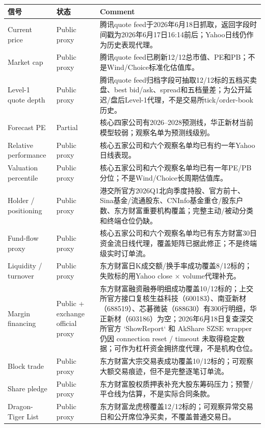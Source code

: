 \begin{exhibitbox}
\small
\begin{tabularx}{\textwidth}{L{3cm}L{2.5cm}X}
\toprule
\textbf{信号} & \textbf{状态} & \textbf{Comment} \\
\midrule
Current price & Public proxy & 腾讯quote feed于2026年6月18日抓取，返回字段时间戳为2026年6月17日16:14前后；Yahoo日线仍作为历史表现代理。 \\
Market cap & Public proxy & 腾讯quote feed已刷新12/12总市值、PE和PB；不是Wind/Choice标准化估值库。 \\
Level-1 quote depth & Public proxy & 腾讯quote feed归档字段可抽取12/12标的五档买卖盘、best bid/ask、spread和五档量差；为公开延迟/盘后Level-1代理，不是交易所tick/order-book历史。 \\
Forecast PE & Partial & 核心四家公司有2026--2028预测线，华正新材当前模型较弱；观察名单为预测线级别。 \\
Relative performance & Public proxy & 核心五家公司和六个观察名单均已有约一年Yahoo日线表现。 \\
Valuation percentile & Public proxy & 核心五家公司和六个观察名单均已有一年PE/PB分位；不是Wind/Choice长周期估值库。 \\
Holder / positioning & Public proxy & 港交所官方2026Q1北向季度持股、官方前十、Sina基金/流通股东、CNInfo基金重仓/股东户数、东方财富重要机构覆盖；完整主动/被动分类和终端仓位仍缺。 \\
Fund-flow proxy & Public proxy & 核心五家公司和六个观察名单均已有东方财富30日资金流日线代理，覆盖矩阵已据此修正；不是终端级实时订单流。 \\
Liquidity / turnover & Public proxy & 东方财富日K成交额/换手率成功覆盖8/12标的；失败标的用Yahoo close $\times$ volume代理补充。 \\
Margin financing & Public + exchange official proxy & 东方财富融资融券明细成功覆盖10/12标的；上交所官方接口复核生益科技（600183）、南亚新材（688519）、芯碁微装（688630）有300行明细，华正新材（603186）为空；2026年6月18日复查深交所官方 `ShowReport` 和 AkShare SZSE wrapper 仍因 connection reset / timeout 未取得稳定数据；可作为杠杆资金拥挤度代理，不是机构仓位。 \\
Block trade & Public proxy & 东方财富大宗交易表成功覆盖10/12标的；可观察大额交易痕迹，但不是完整逐笔订单流。 \\
Share pledge & Public proxy & 东方财富股权质押表补充大股东筹码压力；预警/平仓线为估算，不是实际合同条款。 \\
Dragon-Tiger List & Public proxy & 东方财富龙虎榜覆盖12/12标的；可观察异常交易日和公开席位净买卖，不覆盖普通交易日。 \\

\end{tabularx}
\end{exhibitbox}
